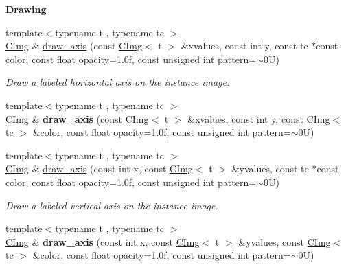 \begin{Indent}{\bf Drawing}
\begin{DoxyCompactItemize}
\item 
{\footnotesize template$<$typename t , typename tc $>$ }\\\hyperlink{structcimg__library_1_1_c_img}{C\-Img} \& \hyperlink{structcimg__library_1_1_c_img_a27bc230085f4e303b0d16a24df534802}{draw\-\_\-axis} (const \hyperlink{structcimg__library_1_1_c_img}{C\-Img}$<$ t $>$ \&xvalues, const int y, const tc $\ast$const color, const float opacity=1.\-0f, const unsigned int pattern=$\sim$0\-U)
\begin{DoxyCompactList}\small\item\em Draw a labeled horizontal axis on the instance image. \end{DoxyCompactList}\item 
\hypertarget{structcimg__library_1_1_c_img_a5c23dba507c6c80840bf93724a04f0a3}{{\footnotesize template$<$typename t , typename tc $>$ }\\\hyperlink{structcimg__library_1_1_c_img}{C\-Img} \& {\bfseries draw\-\_\-axis} (const \hyperlink{structcimg__library_1_1_c_img}{C\-Img}$<$ t $>$ \&xvalues, const int y, const \hyperlink{structcimg__library_1_1_c_img}{C\-Img}$<$ tc $>$ \&color, const float opacity=1.\-0f, const unsigned int pattern=$\sim$0\-U)}\label{structcimg__library_1_1_c_img_a5c23dba507c6c80840bf93724a04f0a3}

\item 
\hypertarget{structcimg__library_1_1_c_img_aee27026b316a2a753065058ac42f2e6c}{{\footnotesize template$<$typename t , typename tc $>$ }\\\hyperlink{structcimg__library_1_1_c_img}{C\-Img} \& \hyperlink{structcimg__library_1_1_c_img_aee27026b316a2a753065058ac42f2e6c}{draw\-\_\-axis} (const int x, const \hyperlink{structcimg__library_1_1_c_img}{C\-Img}$<$ t $>$ \&yvalues, const tc $\ast$const color, const float opacity=1.\-0f, const unsigned int pattern=$\sim$0\-U)}\label{structcimg__library_1_1_c_img_aee27026b316a2a753065058ac42f2e6c}

\begin{DoxyCompactList}\small\item\em Draw a labeled vertical axis on the instance image. \end{DoxyCompactList}\item 
\hypertarget{structcimg__library_1_1_c_img_a9be7a891dd7e5ca5aa6dc7737feac3e2}{{\footnotesize template$<$typename t , typename tc $>$ }\\\hyperlink{structcimg__library_1_1_c_img}{C\-Img} \& {\bfseries draw\-\_\-axis} (const int x, const \hyperlink{structcimg__library_1_1_c_img}{C\-Img}$<$ t $>$ \&yvalues, const \hyperlink{structcimg__library_1_1_c_img}{C\-Img}$<$ tc $>$ \&color, const float opacity=1.\-0f, const unsigned int pattern=$\sim$0\-U)}\label{structcimg__library_1_1_c_img_a9be7a891dd7e5ca5aa6dc7737feac3e2}


\end{DoxyCompactItemize}
\end{Indent}
